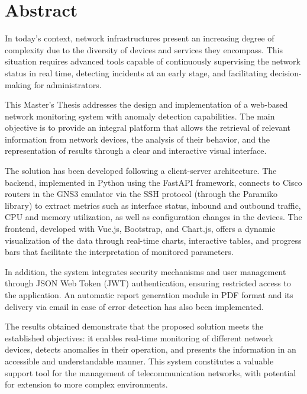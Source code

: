 
\chapter{Abstract}
In today's context, network infrastructures present an increasing degree of complexity due to the diversity of devices and services they encompass. This situation requires advanced tools capable of continuously supervising the network status in real time, detecting incidents at an early stage, and facilitating decision-making for administrators.  

This Master’s Thesis addresses the design and implementation of a web-based network monitoring system with anomaly detection capabilities. The main objective is to provide an integral platform that allows the retrieval of relevant information from network devices, the analysis of their behavior, and the representation of results through a clear and interactive visual interface.  

The solution has been developed following a client-server architecture. The backend, implemented in Python using the FastAPI framework, connects to Cisco routers in the GNS3 emulator via the SSH protocol (through the Paramiko library) to extract metrics such as interface status, inbound and outbound traffic, CPU and memory utilization, as well as configuration changes in the devices. The frontend, developed with Vue.js, Bootstrap, and Chart.js, offers a dynamic visualization of the data through real-time charts, interactive tables, and progress bars that facilitate the interpretation of monitored parameters.  

In addition, the system integrates security mechanisms and user management through JSON Web Token (JWT) authentication, ensuring restricted access to the application. An automatic report generation module in PDF format and its delivery via email in case of error detection has also been implemented.  

The results obtained demonstrate that the proposed solution meets the established objectives: it enables real-time monitoring of different network devices, detects anomalies in their operation, and presents the information in an accessible and understandable manner. This system constitutes a valuable support tool for the management of telecommunication networks, with potential for extension to more complex environments.
